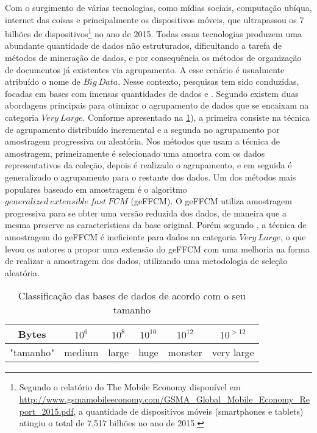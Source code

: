 Com o surgimento de várias tecnologias, como mídias sociais, computação ubíqua, internet das coisas 
e principalmente os dispositivos móveis, que ultrapassou os 7 bilhões de
dispositivos\footnote{Segundo o relatório do The Mobile Economy disponível em
\url{http://www.gsmamobileeconomy.com/GSMA_Global_Mobile_Economy_Report_2015.pdf}, a quantidade de
dispositivos móveis (smartphones e tablets) atingiu o total de 7,517 bilhões no ano de 2015.} no ano
de 2015. Todas essas tecnologias produzem uma abundante quantidade de dados não
estruturados, dificultando a tarefa de métodos de mineração de dados, e por consequência
os métodos de organização de documentos já existentes via agrupamento. A esse cenário é usualmente atribuído
o nome de $Big\ Data$. Nesse contexto, pesquisas tem 
sido conduzidas, focadas em bases com imensas quantidades de dados \cite{Havens2012} e \cite{Kumar2015}. Segundo \cite{Havens2012} 
existem duas abordagens principais para otimizar o agrupamento de dados que se encaixam na categoria
$Very\ Large$. Conforme apresentado na  \ref{table:datasize}), a primeira consiste na técnica de agrupamento
distribuído incremental e a segunda no agrupamento por amostragem progressiva ou aleatória. Nos métodos que
usam a técnica de amostragem, primeiramente é selecionado uma amostra com os dados representativos 
da coleção, depois é realizado o agrupamento, e em seguida é generalizado o agrupamento para o
restante dos dados. Um dos métodos mais populares baseado em amostragem é o algoritmo 
$generalized\ extensible\ fast\ FCM$ (geFFCM)\cite{Havens2012}. O geFFCM utiliza amostragem
progressiva para se obter uma versão reduzida dos dados, de maneira que a mesma preserve as
características da base original. Porém segundo \cite{Havens2012}, a técnica de amostragem do geFFCM
é ineficiente para dados na categoria $Very\ Large$, o que levou os autores a propor uma extensão do
geFFCM com uma melhoria na forma de realizar a amostragem dos dados, utilizando uma metodologia de
seleção aleatória.

\begin{table}[!htp]
  \centering
  \begin{tabular}{ |c|c c c c c|}
    \hline
    Bytes & $10^6$ & $10^8$ & $10^{10}$ & $10^{12}$ & $10^{>12}$ \\
    \hline
    "tamanho" & medium & large & huge & monster & very large \\
    \hline
  \end{tabular}
  \caption{Classificação das bases de dados de acordo com o seu tamanho\cite{Havens2012}}
  \label{table:datasize}
\end{table}

